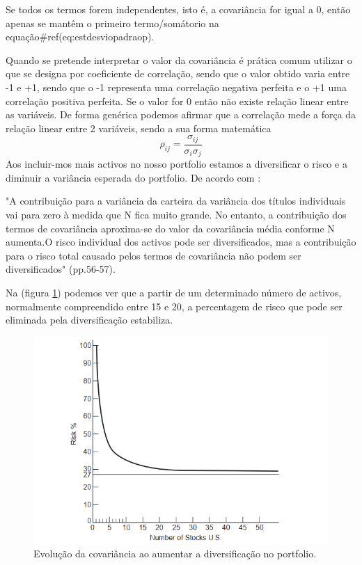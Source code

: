 \documentclass[
  12pt,
  a4paper,
  openany]{book}
\begin{document}
Se todos os termos forem independentes, isto é, a covariância for igual a 0, então apenas se mantêm o primeiro termo/somátorio na equação\#ref(eq:estdesviopadraop).

Quando se pretende interpretar o valor da covariância é prática comum utilizar o que se designa por coeficiente de correlação, sendo que o valor obtido varia entre -1 e +1, sendo que o -1 representa uma correlação negativa perfeita e o +1 uma correlação positiva perfeita. Se o valor for 0 então não existe relação linear entre as variáveis. De forma genérica podemos afirmar que a correlação mede a força da relação linear entre 2 variáveis, sendo a sua forma matemática \[\rho_{ij}=\frac{\sigma_{ij}}{\sigma_{i}\sigma_{j}}\]
Aos incluir-mos mais activos no nosso portfolio estamos a diversificar o risco e a diminuir a variância esperada do portfolio. De acordo com \citet{Goetzmann2014}:

\begin{spacing}{1}
\begin{adjustwidth}{28.3464pt}{28.3464pt}\footnotesize
"A contribuição para a variância da carteira da variância dos títulos individuais vai para zero à medida que N fica muito grande. No entanto, a contribuição dos termos de covariância aproxima-se do valor da covariância média conforme N aumenta.O risco individual dos activos pode ser diversificados, mas a contribuição para o risco total causado pelos termos de covariância não podem ser diversificados" (pp.56-57).
\normalsize\end{adjustwidth}
\end{spacing}
\medskip

Na (figura \ref{fig:covusa}) podemos ver que a partir de um determinado número de activos, normalmente compreendido entre 15 e 20, a percentagem de risco que pode ser eliminada pela diversificação estabiliza.



\begin{figure}

{\centering \includegraphics[width=0.6\linewidth]{image/covusa} 

}

\caption{Evolução da covariância ao aumentar a diversificação no portfolio.}\label{fig:covusa}
\end{figure}
\FloatBarrier
\centering
\end{document}

